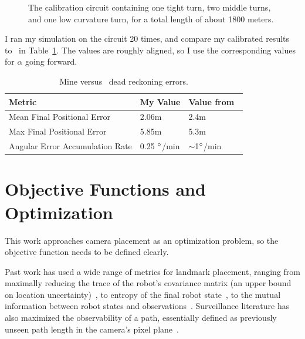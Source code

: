 \documentclass[a4paper,12pt,twoside,openright]{report}
\begin{document}
\begin{figure}
    \begin{center}
        
    \end{center}
    \caption[Calibration Circuit]{The calibration circuit containing one tight turn, two middle turns, and one low curvature turn, for a total length of about 1800 meters.}
    \label{fig:ekf:calibrationcurve}
\end{figure}

I ran my simulation on the circuit 20 times, and compare my calibrated results to~\cite{vivacqua2017low} in
Table~\ref{tab:impl:calibration}. The values are roughly aligned, so I use
the corresponding values for $\alpha$ going forward.

\begin{table}[htb]
\centering
\caption[Noise Calibration Results]{Mine versus~\citeauthor{vivacqua2017low} dead reckoning errors.}
\label{tab:impl:calibration}
\begin{tabular}{@{}lll@{}}
\toprule
Metric                          & My Value           & Value from~\cite{vivacqua2017low} \\ \midrule
Mean Final Positional Error     & 2.06m              & 2.4m                                                          \\
Max Final Positional Error      & 5.85m              & 5.3m                                                          \\
Angular Error Accumulation Rate & 0.25 $\degree$/min & $\sim$1$\degree$/min                                         
\end{tabular}
\end{table}


\section{Objective Functions and Optimization}

This work approaches camera placement as an optimization problem, 
so the objective function needs to be defined clearly.

Past work has used a wide range of metrics for landmark placement, ranging from
maximally reducing the trace of the robot's covariance matrix (an upper bound on location
uncertainty)~\cite{beinhofer2013robust}, to entropy of the final
robot state~\cite{beinhofer2013effective}, to the mutual information between
robot states and observations~\cite{beinhofer2011near}. Surveillance literature
has also maximized the observability of a path, essentially defined as
previously unseen path length in the camera's pixel plane~\cite{bodor2007optimal}.
\end{document}
